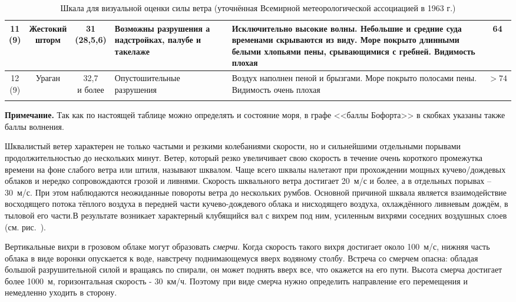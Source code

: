 {\begin{longtable}{c|c|c|p{}|p{}|c}
    \midrule
    \shortstack{11\\(9)} &  \shortstack{Жестокий\\шторм} & \shortstack{31\\(28,5\otdo 32,6)} & Возможны разрушения а надстройках, палубе и такелаже & Исключительно высокие волны. Небольшие и средние суда временами скрываются из виду. Море покрыто длинными белыми хлопьями пены, срывающимися с гребней. Видимость плохая & 64 \\
    \midrule
    \shortstack{12\\(9)} & Ураган & \shortstack{32,7\\и более} & Опустошительные разрушения & Воздух наполнен пеной и брызгами. Море покрыто полосами пены. Видимость очень плохая & $>74$ \\
    \bottomrule
    \caption{Шкала для визуальной оценки силы ветра (уточнённая Всемирной метеорологической ассоциацией в 1963 г.)}
    \label{tab:6}
  \end{longtable}
  \normalsize{}
  \twocolumn
}

{\small \textbf{Примечание.} Так как по настоящей таблице можно
  определять и состояние моря, в графе <<баллы Бофорта>> в скобках
  указаны также баллы волнения.\smallskip}

Шквалистый ветер характерен не только частыми и резкими колебаниями
скорости, но и сильнейшими отдельными порывами продолжительностью до
нескольких минут. Ветер, который резко увеличивает свою скорость в
течение очень короткого промежутка времени на фоне слабого ветра или
штиля, называют шквалом. Чаще всего
шквалы налетают при прохождении мощных кучево\-/дождевых облаков и
нередко сопровождаются грозой и ливнями. Скорость шквального ветра
достигает 20~м/с и более, а в отдельных порывах \--- 30~м/с. При этом наблюдаются неожиданные повороты ветра до нескольких
румбов. Основной причиной шквала является взаимодействие восходящего
потока тёплого воздуха в передней части кучево-дождевого облака и
нисходящего воздуха, охлаждённого ливневым дождём, в тыловой его
части.В результате возникает характерный клубящийся вал с вихрем под
ним, усиленным вихрями соседних воздушных слоев (см. рис.~).

Вертикальные вихри в грозовом облаке могут образовать
\textit{смерчи}. Когда скорость такого
вихря достигает около 100~м/с, нижняя часть облака в виде воронки
опускается к воде, навстречу поднимающемуся вверх водяному
столбу. Встреча со смерчем опасна: обладая большой разрушительной
силой и вращаясь по спирали, он может поднять вверх все, что окажется
на его пути. Высота смерча достигает более 1000~м, горизонтальная
скорость \-- 30~км/ч. Поэтому при виде смерча нужно определить
направление его перемещения и немедленно уходить в сторону.

